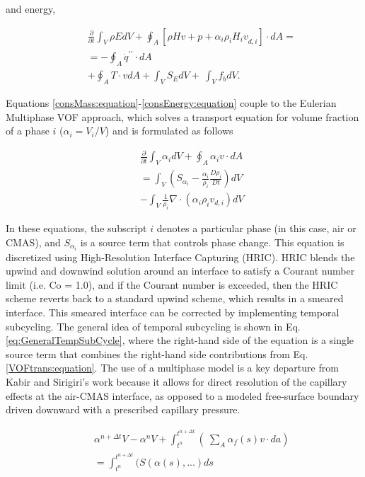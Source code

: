 \documentclass[%
 aip,
 amsmath,amssymb,
 reprint,%
floatfix]{revtex4-1}
\begin{document}
\noindent and energy,

\begin{eqnarray}
\label{consEnergy:equation}
   &&\frac{\partial}{\partial t}\int_{V}\rho EdV+\oint_{A}\left[\rho Hv+p+\alpha_i\rho_i{H_iv}_{d,i}\right]\cdot dA=\nonumber \\
   &&=-\oint_{A}{{\dot{q}}^{\prime\prime}\cdot d A} \\
   &&+\oint_{A}{T\cdot v d A}+\int_{V}{S_EdV}+\ \int_{V}{f_bdV}.\nonumber
\end{eqnarray}


\noindent Equations \ref{consMass:equation}-\ref{consEnergy:equation} couple to the Eulerian Multiphase VOF approach, which solves a transport equation for volume fraction of a phase $i$ ($\alpha_{i} = V_{i}/V$) and is formulated as follows 

\begin{eqnarray}
\label{VOFtrans:equation}
    &&\frac{\partial}{\partial t}\int_{V}\alpha_{i}dV+ \oint_{A}\alpha_{i}v\cdot dA\nonumber\\
    &&=\int_{V}\left(S_{\alpha_{i}}-\frac{\alpha_i}{\rho_i}\frac{D\rho_{i}}{Dt}\right)dV\\
    &&-\int_{V} \frac{1}{\rho_{i}}\nabla\cdot \left(\alpha_{i}\rho_{i}v_{d,i}\right)dV\nonumber
\end{eqnarray}

\noindent In these equations, the subscript $i$ denotes a particular phase (in this case, air or CMAS), and $S_{\alpha_{i}}$ is a source term that controls phase change. This equation is discretized using High-Resolution Interface Capturing (HRIC). HRIC blends the upwind and downwind solution around an interface to satisfy a Courant number limit (i.e. Co = 1.0), and if the Courant number is exceeded, then the HRIC scheme reverts back to a standard upwind scheme, which results in a smeared interface. This smeared interface can be corrected by implementing temporal subcycling. The general idea of temporal subcycling is shown in Eq. \ref{eq:GeneralTempSubCycle}, where the right-hand side of the equation is a single source term that combines the right-hand side contributions from Eq. \ref{VOFtrans:equation}. The use of a multiphase model is a key departure from Kabir and Sirigiri's work \cite{Kabir, Sirigiri2018} because it allows for direct resolution of the capillary effects at the air-CMAS interface, as opposed to a modeled free-surface boundary driven downward with a prescribed capillary pressure.

\begin{eqnarray}
\label{eq:GeneralTempSubCycle}
    &&\alpha^{n+\Delta t}V - \alpha^{n}V + \int_{t^{n}}^{t^{n+\Delta t}}( \ \sum_{A}\alpha_{f}(s) v \cdot da)\nonumber\\
    &&=\int_{t^{n}}^{t^{n+\Delta t}}(S(\alpha (s),...)ds
\end{eqnarray}
\end{document}
